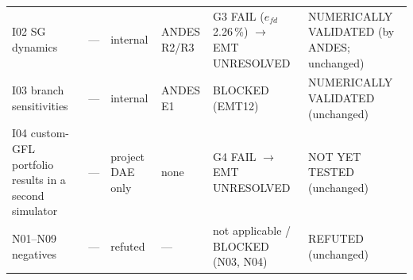 \documentclass[10pt,a4paper]{article}
\begin{document}
{\begin{longtable}{@{}L{3.0cm}L{1.5cm}L{2.0cm}L{2.0cm}L{3.1cm}L{3.0cm}@{}}
I02 SG dynamics & --- & internal & ANDES R2/R3 & G3 FAIL ($e_{fd}$ 2.26\,\%) $\to$ EMT UNRESOLVED & NUMERICALLY VALIDATED (by ANDES; unchanged)\\
I03 branch sensitivities & --- & internal & ANDES E1 & BLOCKED (EMT12) & NUMERICALLY VALIDATED (unchanged)\\
I04 custom-GFL portfolio results in a second simulator & --- & project DAE only & none & G4 FAIL $\to$ EMT UNRESOLVED & NOT YET TESTED (unchanged)\\
N01--N09 negatives & --- & refuted & --- & not applicable / BLOCKED (N03, N04) & REFUTED (unchanged)\\
\bottomrule
\end{longtable}}
\end{document}
